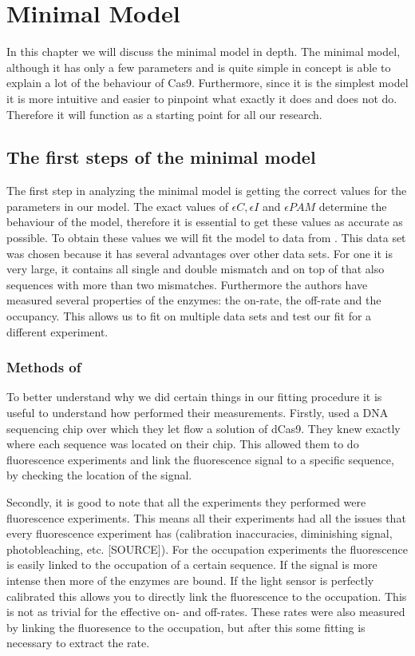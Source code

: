 \chapter{Minimal Model}

In this chapter we will discuss the minimal model in depth. The minimal model, although it has only a few parameters and is quite simple in concept is able to explain a lot of the behaviour of Cas9. Furthermore, since it is the simplest model it is more intuitive and easier to pinpoint what exactly it does and does not do. Therefore it will function as a starting point for all our research.

\section{The first steps of the minimal model}

The first step in analyzing the minimal model is getting the correct values for the parameters in our model. The exact values of $\epsilon C, \epsilon I$ and $\epsilon PAM$ determine the behaviour of the model, therefore it is essential to get these values as accurate as possible. To obtain these values we will fit the model to data from \cite{PNAS}. This data set was chosen because it has several advantages over other data sets. For one it is very large, it contains all single and double mismatch and on top of that also sequences with more than two mismatches. Furthermore the authors have measured several properties of the enzymes: the on-rate, the off-rate and the occupancy. This allows us to fit on multiple data sets and test our fit for a different experiment.

\subsection{Methods of \cite{PNAS}}
\label{sec:BoyleMethods}

To better understand why we did certain things in our fitting procedure it is useful to understand how \citep{PNAS} performed their measurements. Firstly, \cite{PNAS} used a DNA sequencing chip over which they let flow a solution of dCas9. %
They knew exactly where each sequence was located on their chip. This allowed them to do fluorescence experiments and link the fluorescence signal to a specific sequence, by checking the location of the signal.

Secondly, it is good to note that all the experiments they performed were fluorescence experiments. This means all their experiments had all the issues that every fluorescence experiment has (calibration inaccuracies, diminishing signal, photobleaching, etc. [SOURCE]). For the occupation experiments the fluorescence is easily linked to the occupation of a certain sequence. If the signal is more intense then more of the enzymes are bound. If the light sensor is perfectly calibrated this allows you to directly link the fluorescence to the occupation. This is not as trivial for the effective on- and off-rates. These rates were also measured by linking the fluoresence to the occupation, but after this some fitting is necessary to extract the rate.

